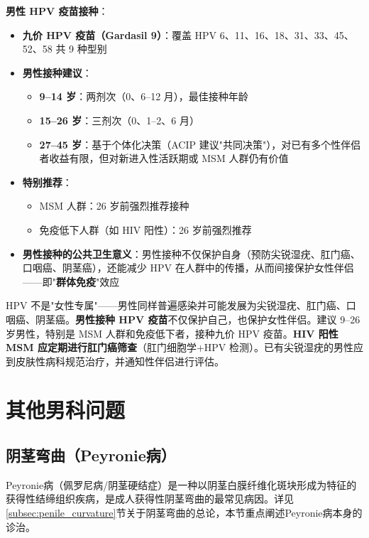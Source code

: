 \vspace{0.5em}
\noindent\textbf{男性 HPV 疫苗接种}：

\begin{itemize}[leftmargin=2cm]
	\item \textbf{九价 HPV 疫苗（Gardasil 9）}：覆盖 HPV 6、11、16、18、31、33、45、52、58 共 9 种型别
	\item \textbf{男性接种建议}：
	\begin{itemize}
		\item \textbf{9--14 岁}：两剂次（0、6--12 月），最佳接种年龄
		\item \textbf{15--26 岁}：三剂次（0、1--2、6 月）
		\item \textbf{27--45 岁}：基于个体化决策（ACIP 建议"共同决策"），对已有多个性伴侣者收益有限，但对新进入性活跃期或 MSM 人群仍有价值
	\end{itemize}
	\item \textbf{特别推荐}：
	\begin{itemize}
		\item MSM 人群：26 岁前强烈推荐接种
		\item 免疫低下人群（如 HIV 阳性）：26 岁前强烈推荐
	\end{itemize}
	\item \textbf{男性接种的公共卫生意义}：男性接种不仅保护自身（预防尖锐湿疣、肛门癌、口咽癌、阴茎癌），还能减少 HPV 在人群中的传播，从而间接保护女性伴侣——即"\textbf{群体免疫}"效应
\end{itemize}

\begin{tcolorbox}[colback=pink!5!white,colframe=red!50!black,title=贴心小叮咛]
HPV 不是"女性专属"——男性同样普遍感染并可能发展为尖锐湿疣、肛门癌、口咽癌、阴茎癌。\textbf{男性接种 HPV 疫苗}不仅保护自己，也保护女性伴侣。建议 9--26 岁男性，特别是 MSM 人群和免疫低下者，接种九价 HPV 疫苗。\textbf{HIV 阳性 MSM 应定期进行肛门癌筛查}（肛门细胞学+HPV 检测）。已有尖锐湿疣的男性应到皮肤性病科规范治疗，并通知性伴侣进行评估。
\end{tcolorbox}

\section{其他男科问题}
\subsection{阴茎弯曲（Peyronie病）}
\label{subsec:peyronie}

Peyronie病（佩罗尼病/阴茎硬结症）是一种以阴茎白膜纤维化斑块形成为特征的获得性结缔组织疾病，是成人获得性阴茎弯曲的最常见病因。详见\ref{subsec:penile_curvature}节关于阴茎弯曲的总论，本节重点阐述Peyronie病本身的诊治。

